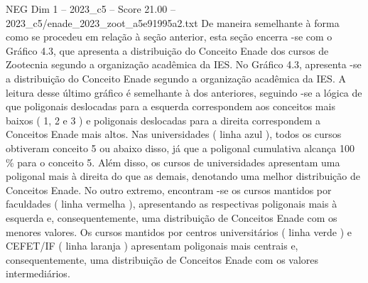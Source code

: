 \begin{textsample}{NEG Dim 1 – 2023\_c5 – Score 21.00 – 2023\_c5/enade\_2023\_zoot\_a5e91995a2.txt}
De maneira semelhante à forma como se procedeu em relação à seção anterior, esta seção encerra -se com o Gráfico 4.3, que apresenta a distribuição do Conceito Enade dos cursos de Zootecnia segundo a organização acadêmica da IES.
No Gráfico 4.3, apresenta -se a distribuição do Conceito Enade segundo a organização acadêmica da IES.
A leitura desse último gráfico é semelhante à dos anteriores, seguindo -se a lógica de que poligonais deslocadas para a esquerda correspondem aos conceitos mais baixos ( 1, 2 e 3 ) e poligonais deslocadas para a direita correspondem a Conceitos Enade mais altos.
Nas universidades ( linha azul ), todos os cursos obtiveram conceito 5 ou abaixo disso, já que a poligonal cumulativa alcança 100 \% para o conceito 5.
Além disso, os cursos de universidades apresentam uma poligonal mais à direita do que as demais, denotando uma melhor distribuição de Conceitos Enade.
No outro extremo, encontram -se os cursos mantidos por faculdades ( linha vermelha ), apresentando as respectivas poligonais mais à esquerda e, consequentemente, uma distribuição de Conceitos Enade com os menores valores.
Os cursos mantidos por centros universitários ( linha verde ) e CEFET/IF ( linha laranja ) apresentam poligonais mais centrais e, consequentemente, uma distribuição de Conceitos Enade com os valores intermediários.

\end{textsample}
